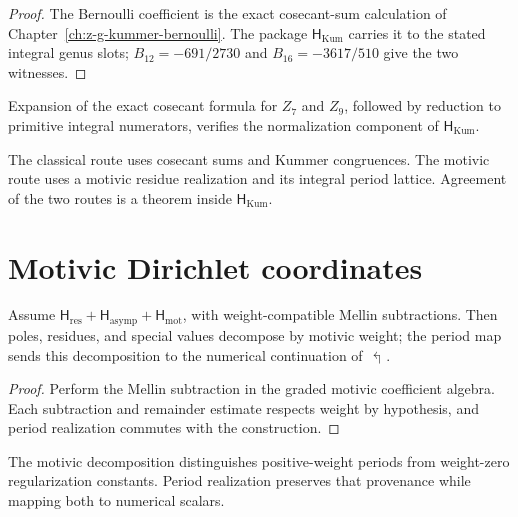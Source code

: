 \begin{proof}
The Bernoulli coefficient is the exact cosecant-sum calculation of
Chapter~\ref{ch:z-g-kummer-bernoulli}.  The package
\(\mathsf H_{\mathrm{Kum}}\) carries it to the stated integral genus
slots; \(B_{12}=-691/2730\) and \(B_{16}=-3617/510\) give the two
witnesses.
\end{proof}

\begin{remark}
\label{rem:shL-falsification-test}
Expansion of the exact cosecant formula for \(Z_7\) and \(Z_9\),
followed by reduction to primitive integral numerators, verifies the
normalization component of \(\mathsf H_{\mathrm{Kum}}\).
\end{remark}

\begin{remark}
\label{rem:shL-classical-route}
The classical route uses cosecant sums and Kummer congruences.  The
motivic route uses a motivic residue realization and its integral
period lattice.  Agreement of the two routes is a theorem inside
\(\mathsf H_{\mathrm{Kum}}\).
\end{remark}

\section{Motivic Dirichlet coordinates}
\label{sec:shL-motivic-upgrade}

\begin{corollary}
\label{cor:shadow-L-motivic-upgrade}
\ClaimStatusConditional
Assume \(\mathsf H_{\mathrm{res}}+\mathsf H_{\mathrm{asymp}}
+\mathsf H_{\mathrm{mot}}\), with weight-compatible Mellin
subtractions.  Then poles, residues, and special values decompose by
motivic weight; the period map sends this decomposition to the
numerical continuation of \(\Lsh\).
\end{corollary}

\begin{proof}
Perform the Mellin subtraction in the graded motivic coefficient
algebra.  Each subtraction and remainder estimate respects weight by
hypothesis, and period realization commutes with the construction.
\end{proof}

\begin{remark}
\label{rem:shL-motivic-period-map-collapse}
The motivic decomposition distinguishes positive-weight periods from
weight-zero regularization constants.  Period realization preserves
that provenance while mapping both to numerical scalars.
\end{remark}
